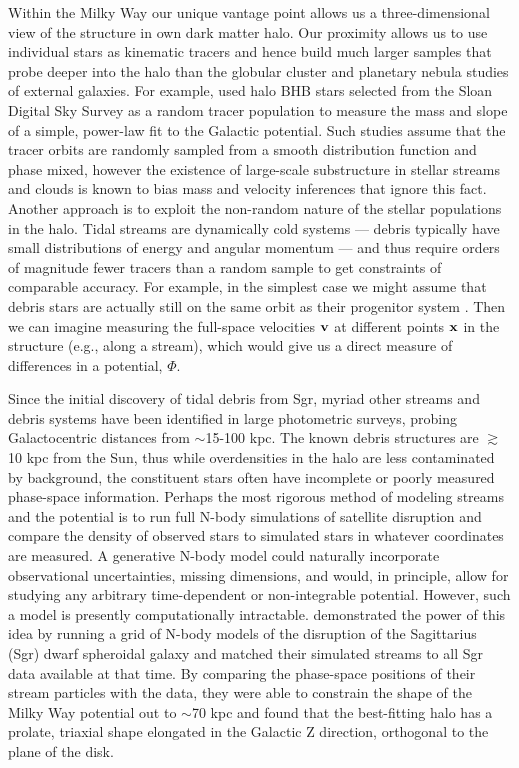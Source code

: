 \documentclass[letterpaper,12pt,preprint]{aastex}
\begin{document}
Within the Milky Way our unique vantage point allows us a three-dimensional view of the structure in own dark matter halo. Our proximity allows us to use individual stars as kinematic tracers and hence build much larger samples that probe deeper into the halo than the globular cluster and planetary nebula studies of external galaxies. For example, \cite{deason12a} used halo BHB stars selected from the Sloan Digital Sky Survey \cite[SDSS;][]{york00} as a random tracer population to measure the mass and slope of a simple, power-law fit to the Galactic potential. Such studies assume that the tracer orbits are randomly sampled from a smooth distribution function and phase mixed, however the existence of large-scale substructure in stellar streams and clouds is known to bias mass and velocity inferences that ignore this fact. Another approach is to exploit the non-random nature of the stellar populations in the halo. Tidal streams are dynamically cold systems --- debris typically have small distributions of energy and angular momentum --- and thus require orders of magnitude fewer tracers than a random sample to get constraints of comparable accuracy. For example, in the simplest case we might assume that debris stars are actually still on the same orbit as their progenitor system \citep[a \emph{wrong} assumption, see e.g.,][]{}. Then we can imagine measuring the full-space velocities ${\bf v}$ at different points ${\bf x}$ in the structure (e.g., along a stream), which would give us a direct measure of differences in a potential, $\Phi$. 

Since the initial discovery of tidal debris from Sgr, myriad other streams and debris systems have been identified in large photometric surveys, probing Galactocentric distances from $\sim$15-100 kpc. The known debris structures are $\gtrsim$10 kpc from the Sun, thus while overdensities in the halo are less contaminated by background, the constituent stars often have incomplete or poorly measured phase-space information. Perhaps the most rigorous method of modeling streams and the potential is to run full N-body simulations of satellite disruption and compare the density of observed stars to simulated stars in whatever coordinates are measured. A generative N-body model could naturally incorporate observational uncertainties, missing dimensions, and would, in principle, allow for studying any arbitrary time-dependent or non-integrable potential. However, such a model is presently computationally intractable. \cite{law10} demonstrated the power of this idea by running a grid of N-body models of the disruption of the Sagittarius (Sgr) dwarf spheroidal galaxy and matched their simulated streams to all Sgr data available at that time. By comparing the phase-space positions of their stream particles with the data, they were able to constrain the shape of the Milky Way potential out to $\sim$70 kpc and found that the best-fitting halo has a prolate, triaxial shape elongated in the Galactic Z direction, orthogonal to the plane of the disk. 
\end{document}
